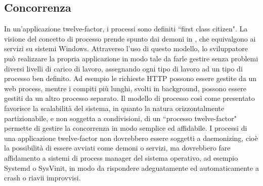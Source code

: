\documentclass[NormeDiProgetto.tex]{subfiles}
\begin{document}
\subsection{Concorrenza}
In un'applicazione twelve-factor, i processi sono definiti \textquotedblleft first class citizen". La visione del concetto di processo prende spunto dai demoni in , che equivalgono ai servizi su sistemi Windows.
Attraverso l'uso di questo modello, lo sviluppatore può realizzare la propria applicazione in modo tale da farle gestire senza problemi diversi livelli di carico di lavoro, assegnando ogni tipo di lavoro ad un tipo di processo ben definito.
Ad esempio le richieste HTTP possono essere gestite da un web process, mentre i compiti più lunghi, svolti in background, possono essere gestiti da un altro processo separato.
Il modello di processo così come presentato favorisce la scalabilità del sistema, in quanto la natura orizzontalmente partizionabile, e non soggetta a condivisioni, di un \textquotedblleft processo twelve-factor" permette di gestire la concorrenza in modo semplice ed affidabile. 
I processi di una applicazione twelve-factor non dovrebbero essere soggetti a daemonizing, cioè la possibilità di essere avviati come demoni o servizi, ma dovrebbero fare affidamento a sistemi di process manager del sistema operativo, ad esempio Systemd o SysVinit, in modo da rispondere adeguatamente ed automaticamente a crash o riavii improvvisi.
\end{document}
